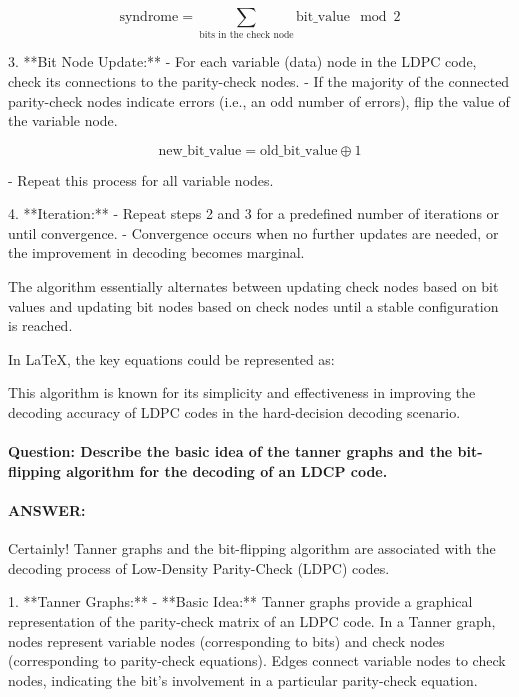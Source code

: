 \documentclass[colorlinks,11pt,a4paper,normalphoto,withhyper,ragged2e]{altareport}
\begin{document}
				\[ \text{syndrome} = \sum_{\text{bits in the check node}} \text{bit\_value} \mod 2 \]
				
				3. **Bit Node Update:**
				- For each variable (data) node in the LDPC code, check its connections to the parity-check nodes.
				- If the majority of the connected parity-check nodes indicate errors (i.e., an odd number of errors), flip the value of the variable node.
				
				\[ \text{new\_bit\_value} = \text{old\_bit\_value} \oplus 1 \]
				
				- Repeat this process for all variable nodes.
				
				4. **Iteration:**
				- Repeat steps 2 and 3 for a predefined number of iterations or until convergence.
				- Convergence occurs when no further updates are needed, or the improvement in decoding becomes marginal.
				
				The algorithm essentially alternates between updating check nodes based on bit values and updating bit nodes based on check nodes until a stable configuration is reached.
				
				In LaTeX, the key equations could be represented as:
				
%				
				
				This algorithm is known for its simplicity and effectiveness in improving the decoding accuracy of LDPC codes in the hard-decision decoding scenario.
				
				
				
				
				
				\paragraph{Question: Describe the basic idea of the tanner graphs and the bit-flipping algorithm for the decoding of an LDCP code.}
				\paragraph{ANSWER:}
				
				Certainly! Tanner graphs and the bit-flipping algorithm are associated with the decoding process of Low-Density Parity-Check (LDPC) codes.
				
				1. **Tanner Graphs:**
				- **Basic Idea:** Tanner graphs provide a graphical representation of the parity-check matrix of an LDPC code. In a Tanner graph, nodes represent variable nodes (corresponding to bits) and check nodes (corresponding to parity-check equations). Edges connect variable nodes to check nodes, indicating the bit's involvement in a particular parity-check equation.
				
\end{document}
